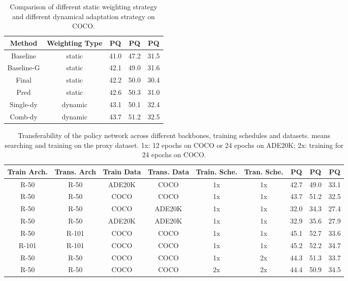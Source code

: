 \documentclass[letterpaper]{article} \usepackage{aaai21}  \usepackage{times}  \usepackage{helvet} \usepackage{courier}  \usepackage[hyphens]{url}  \usepackage{graphicx} \urlstyle{rm} \def\UrlFont{\rm}  \usepackage{natbib}  \usepackage{caption} \frenchspacing  \setlength{\pdfpagewidth}{8.5in}  \setlength{\pdfpageheight}{11in}
\begin{document}
      
 
  \begin{table}[t]
    \begin{centering}
    \tabcolsep 0.03in\renewcommand{\arraystretch}{1.2}{\footnotesize{}}\begin{tabular}{c|c|ccc}
    \hline 
    Method & Weighting Type & PQ & PQ & PQ \tabularnewline
    \hline 
    Baseline & static & 41.0 & 47.2 & 31.5 \tabularnewline
    Baseline-G & static & 42.1 & 49.0 & 31.6 \tabularnewline
    Final & static & 42.2 & 50.0 & 30.4 \tabularnewline
    Pred & static & 42.6 & 50.3 & 31.0 \tabularnewline
    Single-dy & dynamic & 43.1 & 50.1 & 32.4 \tabularnewline
    Comb-dy & dynamic & 43.7 & 51.2 & 32.5 \tabularnewline
    \hline 
    \end{tabular}{\footnotesize\par}
    \par\end{centering}
\caption{\label{tab:ana-dy} Comparison of different static weighting strategy and different 
    dynamical adaptation strategy on COCO.}
\end{table}  
  

  \begin{table*}[t]
\begin{centering}
    \tabcolsep 0.05in\renewcommand{\arraystretch}{1.2}{\footnotesize{}}\begin{tabular}{c|c|c|c|c|c|ccc}
    \hline
    Train Arch. & Trans. Arch & Train Data & Trans. Data & Train. Sche. & Tran. Sche. & PQ & PQ & PQ\tabularnewline
    \hline 
    \hline
    R-50 & R-50 & ADE20K & COCO & 1x & 1x & 42.7 & 49.0 & 33.1 \tabularnewline
    R-50 & R-50 & COCO & COCO & 1x & 1x & 43.7 & 51.2 & 32.5 \tabularnewline
    R-50 & R-50 & COCO & ADE20K & 1x & 1x & 32.0 & 34.3 & 27.4 \tabularnewline
    R-50 & R-50 & ADE20K & ADE20K & 1x & 1x & 32.9 & 35.6 & 27.9\tabularnewline
    \hline 
    R-50 & R-101 & COCO & COCO & 1x & 1x & 45.1 & 52.7 & 33.6 \tabularnewline
    R-101 & R-101 & COCO & COCO & 1x & 1x & 45.2 & 52.2 & 34.7 \tabularnewline
    \hline
    R-50 & R-50 & COCO & COCO & 1x & 2x & 44.3 & 51.3 & 33.7 \tabularnewline
    R-50 & R-50 & COCO & COCO & 2x & 2x & 44.4 & 50.9 & 34.5 \tabularnewline
    \hline
    \end{tabular}{\footnotesize\par}
    \par\end{centering}
\caption{\label{tab:transfer} Transferability of the policy network across 
    different backbones, training schedules and datasets.
     means searching and training on the proxy dataset.
    1x: 12 epochs on COCO or 24 epochs on ADE20K; 2x: training for 24 epochs on COCO.}
\end{table*}
\end{document}
